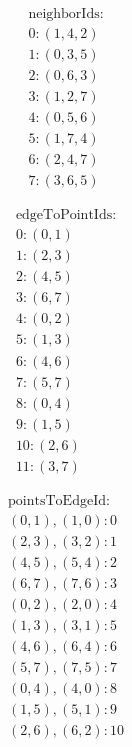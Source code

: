 \begin{figure}
	\begin{subfigure}[t]{0.24\textwidth}
		\begin{align*}
		\text{neighborIds:} \\
		0: (1, 4, 2) \\
		1: (0, 3, 5) \\
		2: (0, 6, 3) \\
		3: (1, 2, 7) \\
		4: (0, 5, 6) \\
		5: (1, 7, 4) \\
		6: (2, 4, 7) \\
		7: (3, 6, 5)
		\end{align*}
	\end{subfigure}
	\begin{subfigure}[t]{0.24\textwidth}
		\begin{align*}
		\text{edgeToPointIds:} \\
		 0: (0, 1) \\
		 1: (2, 3) \\
		 2: (4, 5) \\
		 3: (6, 7) \\
		 4: (0, 2) \\
		 5: (1, 3) \\
		 6: (4, 6) \\
		 7: (5, 7) \\
		 8: (0, 4) \\
		 9: (1, 5) \\
		10: (2, 6) \\
		11: (3, 7)
		\end{align*}
	\end{subfigure}
	\begin{subfigure}[t]{0.24\textwidth}
		\begin{align*}
		\text{pointsToEdgeId:} \\
		(0, 1), (1, 0):  0 \\
		(2, 3), (3, 2):  1 \\
		(4, 5), (5, 4):  2 \\
		(6, 7), (7, 6):  3 \\
		(0, 2), (2, 0):  4 \\
		(1, 3), (3, 1):  5 \\
		(4, 6), (6, 4):  6 \\
		(5, 7), (7, 5):  7 \\
		(0, 4), (4, 0):  8 \\
		(1, 5), (5, 1):  9 \\
		(2, 6), (6, 2): 10 \\

\end{align*}
\end{subfigure}
\end{figure}
